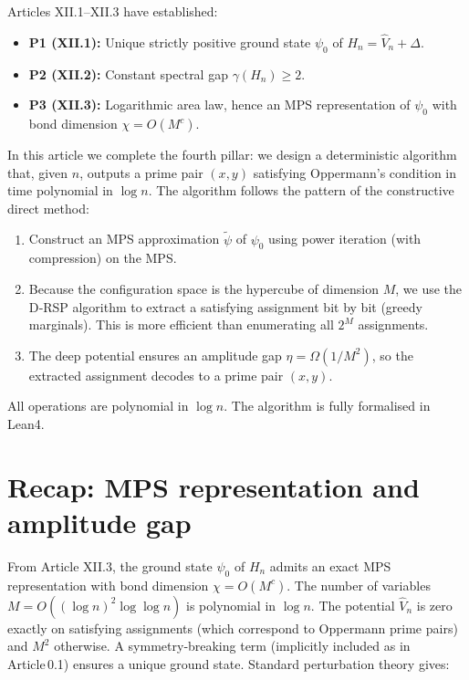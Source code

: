 \documentclass[11pt,a4paper]{article}
\begin{document}
Articles XII.1–XII.3 have established:
\begin{itemize}
\item \textbf{P1 (XII.1):} Unique strictly positive ground state \(\psi_0\) of \(H_n = \hat{V}_n + \Delta\).
\item \textbf{P2 (XII.2):} Constant spectral gap \(\gamma(H_n) \ge 2\).
\item \textbf{P3 (XII.3):} Logarithmic area law, hence an MPS representation of \(\psi_0\) with bond dimension \(\chi = O(M^c)\).
\end{itemize}
In this article we complete the fourth pillar: we design a deterministic algorithm that, given \(n\), outputs a prime pair \((x,y)\) satisfying Oppermann's condition in time polynomial in \(\log n\). The algorithm follows the pattern of the constructive direct method:
\begin{enumerate}
\item Construct an MPS approximation \(\tilde{\psi}\) of \(\psi_0\) using power iteration (with compression) on the MPS.
\item Because the configuration space is the hypercube of dimension \(M\), we use the D‑RSP algorithm to extract a satisfying assignment bit by bit (greedy marginals). This is more efficient than enumerating all \(2^M\) assignments.
\item The deep potential ensures an amplitude gap \(\eta = \Omega(1/M^2)\), so the extracted assignment decodes to a prime pair \((x,y)\).
\end{enumerate}
All operations are polynomial in \(\log n\). The algorithm is fully formalised in Lean4.

\section{Recap: MPS representation and amplitude gap}

From Article XII.3, the ground state \(\psi_0\) of \(H_n\) admits an exact MPS representation with bond dimension \(\chi = O(M^c)\). The number of variables \(M = O((\log n)^2 \log \log n)\) is polynomial in \(\log n\). The potential \(\hat{V}_n\) is zero exactly on satisfying assignments (which correspond to Oppermann prime pairs) and \(M^2\) otherwise. A symmetry‑breaking term (implicitly included as in Article 0.1) ensures a unique ground state. Standard perturbation theory gives:
\end{document}
